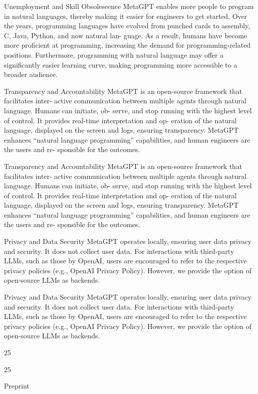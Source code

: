 \documentclass[12pt]{article}
\begin{document}
Unemployment and Skill Obsolescence MetaGPT enables more people to program in natural
languages, thereby making it easier for engineers to get started. Over the years, programming
languages have evolved from punched cards to assembly, C, Java, Python, and now natural lan-
guage. As a result, humans have become more proficient at programming, increasing the demand
for programming-related positions. Furthermore, programming with natural language may offer a
significantly easier learning curve, making programming more accessible to a broader audience.


Transparency and Accountability MetaGPT is an open-source framework that facilitates inter-
active communication between multiple agents through natural language. Humans can initiate, ob-
serve, and stop running with the highest level of control. It provides real-time interpretation and op-
eration of the natural language, displayed on the screen and logs, ensuring transparency. MetaGPT
enhances “natural language programming” capabilities, and human engineers are the users and re-
sponsible for the outcomes.


Transparency and Accountability MetaGPT is an open-source framework that facilitates inter-
active communication between multiple agents through natural language. Humans can initiate, ob-
serve, and stop running with the highest level of control. It provides real-time interpretation and op-
eration of the natural language, displayed on the screen and logs, ensuring transparency. MetaGPT
enhances “natural language programming” capabilities, and human engineers are the users and re-
sponsible for the outcomes.


Privacy and Data Security MetaGPT operates locally, ensuring user data privacy and security. It
does not collect user data. For interactions with third-party LLMs, such as those by OpenAI, users
are encouraged to refer to the respective privacy policies (e.g., OpenAI Privacy Policy). However,
we provide the option of open-source LLMs as backends.


Privacy and Data Security MetaGPT operates locally, ensuring user data privacy and security. It
does not collect user data. For interactions with third-party LLMs, such as those by OpenAI, users
are encouraged to refer to the respective privacy policies (e.g., OpenAI Privacy Policy). However,
we provide the option of open-source LLMs as backends.


25


25


Preprint
\end{document}

